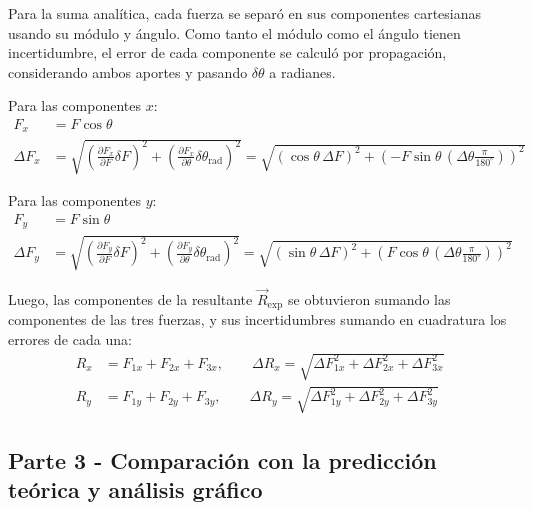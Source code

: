 \documentclass[12pt,a4paper]{article}
\begin{document}
Para la suma analítica, cada fuerza se separó en sus componentes cartesianas usando su módulo y ángulo. Como tanto el módulo como el ángulo tienen incertidumbre, el error de cada componente se calculó por propagación, considerando ambos aportes y pasando $\delta\theta$ a radianes.

Para las componentes $x$:
\begin{align*}
F_x &= F \cos\theta \\
\Delta F_x &= \sqrt{\left(\frac{\partial F_x}{\partial F}\delta F\right)^2 + \left(\frac{\partial F_x}{\partial \theta}\delta \theta_{\text{rad}}\right)^2} = \sqrt{\left(\cos\theta \, \Delta F\right)^2 + \left(-F\sin\theta \, \left(\Delta \theta \frac{\pi}{180^\circ}\right)\right)^2}
\end{align*}

Para las componentes $y$:
\begin{align*}
    F_y &= F \sin\theta \\
    \Delta F_y &= \sqrt{\left(\frac{\partial F_y}{\partial F}\delta F\right)^2 + \left(\frac{\partial F_y}{\partial \theta}\delta \theta_{\text{rad}}\right)^2} = \sqrt{\left(\sin\theta \, \Delta F\right)^2 + \left(F\cos\theta \, \left(\Delta \theta \frac{\pi}{180^\circ}\right)\right)^2}
\end{align*}

Luego, las componentes de la resultante $\vec{R}_{\text{exp}}$ se obtuvieron sumando las componentes de las tres fuerzas, y sus incertidumbres sumando en cuadratura los errores de cada una:
\begin{align*}
R_x &= F_{1x} + F_{2x} + F_{3x}, \qquad \Delta R_x = \sqrt{\Delta F_{1x}^2 + \Delta F_{2x}^2 + \Delta F_{3x}^2} \\
R_y &= F_{1y} + F_{2y} + F_{3y}, \qquad \Delta R_y = \sqrt{\Delta F_{1y}^2 + \Delta F_{2y}^2 + \Delta F_{3y}^2}
\end{align*}

\subsection{Parte 3 - Comparación con la predicción teórica y análisis gráfico} \label{Procedimiento-Parte-3}
\end{document}
